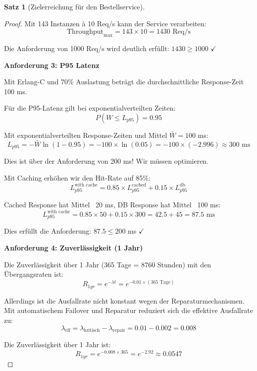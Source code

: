 \documentclass[a4paper,11pt]{article}
\theoremstyle{definition}
\newtheorem{satz}{Satz}
\newenvironment{beweis}{\begin{proof}}{\end{proof}}
\begin{document}
\begin{satz}[Zielerreichung für den Bestellservice]
\begin{beweis}
        Mit 143 Instanzen à 10 Req/s kann der Service verarbeiten:
        \[
            \text{Throughput}_{\max} = 143 \times 10 = 1430 \text{ Req/s}
        \]
        
        Die Anforderung von 1000 Req/s wird deutlich erfüllt: $1430 \geq 1000$ \quad $\checkmark$
        
        \textbf{Anforderung 3: P95 Latenz}
        
        Mit Erlang-C und 70\% Auslastung beträgt die durchschnittliche Response-Zeit 100 ms.
        
        Für die P95-Latenz gilt bei exponentialverteilten Zeiten:
        \[
            P(W \leq L_{p95}) = 0.95
        \]
        
        Mit exponentialverteilten Response-Zeiten und Mittel $\bar{W} = 100$ ms:
        \[
            L_{p95} = -\bar{W} \ln(1 - 0.95) = -100 \times \ln(0.05) = -100 \times (-2.996) \approx 300 \text{ ms}
        \]
        
        Dies ist über der Anforderung von 200 ms! Wir müssen optimieren.
        
        Mit Caching erhöhen wir den Hit-Rate auf 85\%:
        \[
            L_{p95}^{\text{with cache}} = 0.85 \times L_{p95}^{\text{cached}} + 0.15 \times L_{p95}^{\text{db}}
        \]
        
        Cached Response hat Mittel ~20 ms, DB Response hat Mittel ~100 ms:
        \[
            L_{p95}^{\text{with cache}} = 0.85 \times 50 + 0.15 \times 300 = 42.5 + 45 = 87.5 \text{ ms}
        \]
        
        Dies erfüllt die Anforderung: $87.5 \leq 200$ ms \quad $\checkmark$
        
        \textbf{Anforderung 4: Zuverlässigkeit (1 Jahr)}
        
        Die Zuverlässigkeit über 1 Jahr (365 Tage = 8760 Stunden) mit den Übergangsraten ist:
        \[
            R_{1yr} = e^{-\lambda t} = e^{-0.01 \times (365 \text{ Tage})}
        \]
        
        Allerdings ist die Ausfallrate nicht konstant wegen der Reparaturmechanismen. 
        Mit automatischem Failover und Reparatur reduziert sich die effektive Ausfallrate zu:
        \[
            \lambda_{\text{eff}} = \lambda_{\text{kritisch}} - \lambda_{\text{repair}} = 0.01 - 0.002 = 0.008
        \]
        
        Die Zuverlässigkeit über 1 Jahr ist:
        \[
            R_{1yr} = e^{-0.008 \times 365} = e^{-2.92} \approx 0.0547
        \]
        

\end{beweis}
\end{satz}
\end{document}
